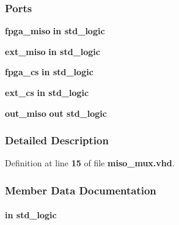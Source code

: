 \subsubsection*{Ports}
 \begin{DoxyCompactItemize}
\item 
{\bf fpga\+\_\+miso}  {\bfseries {\bfseries \textcolor{keywordflow}{in}\textcolor{vhdlchar}{ }}} {\bfseries \textcolor{comment}{std\+\_\+logic}\textcolor{vhdlchar}{ }} 
\item 
{\bf ext\+\_\+miso}  {\bfseries {\bfseries \textcolor{keywordflow}{in}\textcolor{vhdlchar}{ }}} {\bfseries \textcolor{comment}{std\+\_\+logic}\textcolor{vhdlchar}{ }} 
\item 
{\bf fpga\+\_\+cs}  {\bfseries {\bfseries \textcolor{keywordflow}{in}\textcolor{vhdlchar}{ }}} {\bfseries \textcolor{comment}{std\+\_\+logic}\textcolor{vhdlchar}{ }} 
\item 
{\bf ext\+\_\+cs}  {\bfseries {\bfseries \textcolor{keywordflow}{in}\textcolor{vhdlchar}{ }}} {\bfseries \textcolor{comment}{std\+\_\+logic}\textcolor{vhdlchar}{ }} 
\item 
{\bf out\+\_\+miso}  {\bfseries {\bfseries \textcolor{keywordflow}{out}\textcolor{vhdlchar}{ }}} {\bfseries \textcolor{comment}{std\+\_\+logic}\textcolor{vhdlchar}{ }} 
\end{DoxyCompactItemize}


\subsubsection{Detailed Description}


Definition at line {\bf 15} of file {\bf miso\+\_\+mux.\+vhd}.



\subsubsection{Member Data Documentation}
\paragraph[{ext\+\_\+cs}]{ {\bfseries \textcolor{keywordflow}{in}\textcolor{vhdlchar}{ }} {\bfseries \textcolor{comment}{std\+\_\+logic}\textcolor{vhdlchar}{ }} \hspace{0.3cm}{\ttfamily [Port]}}\label{classmiso__mux_ae28a8fd3d35a9f79a296b560d757d485}


